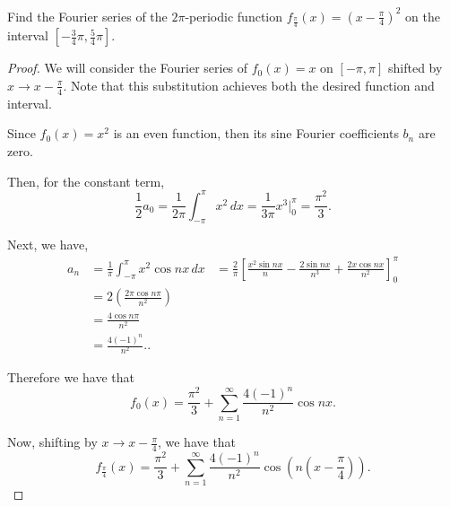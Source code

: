 \documentclass[../hw6]{subfiles}
\begin{document}
\begin{problem}
Find the Fourier series of the $2\pi$-periodic function $f_{\frac{\pi}{4}}(x)=\left( x-\frac{\pi}{4} \right) ^2$ on the interval $\left[ -\frac{3}{4}\pi,\frac{5}{4}\pi \right] $.
\end{problem}
\begin{proof}
	We will consider the Fourier series of $f_0(x)=x$ on $[-\pi,\pi]$ shifted by $x \to x-\frac{\pi}{4}$.
	Note that this substitution achieves both the desired function and interval.

	Since $f_0(x)=x^2$ is an even function, then its sine Fourier coefficients $b_n$ are zero.

	Then, for the constant term, \[
		\frac{1}{2}a_0=\frac{1}{2\pi}\int_{-\pi}^{\pi} x^2 \,dx = \frac{1}{3\pi}x^3\vert_0^{\pi}=\frac{\pi^2}{3}
		.\]

	Next, we have,
	\begin{align*}
		a_n & = \frac{1}{\pi} \int_{-\pi}^{\pi} x^2\cos{nx}  \,dx
		    & = \frac{2}{\pi}\left[ \frac{x^2\sin{nx}}{n}-\frac{2\sin{nx}}{n^3}+\frac{2x\cos{nx} }{n^2} \right]_0^{\pi} \\
		    & = 2\left( \frac{2\pi \cos{n\pi} }{n^2} \right)                                                            \\
		    & = \frac{4\cos{n\pi} }{n^2}                                                                                \\
		    & = \frac{ 4(-1)^n }{n^2}.
		.\end{align*}

	Therefore we have that \[
		f_0(x)=\frac{\pi^2}{3} + \sum_{n=1}^{\infty} \frac{4(-1)^n}{n^2}\cos{nx}
		.\]

	Now, shifting by $x\to x-\frac{\pi}{4}$, we have that \[
		f_{\frac{\pi}{4}}(x)=\frac{\pi^2}{3}+\sum_{n=1}^{\infty} \frac{4(-1)^n}{n^2}\cos{\left( n \left( x-\frac{\pi}{4} \right)  \right) }
		.\]
\end{proof}
\end{document}
